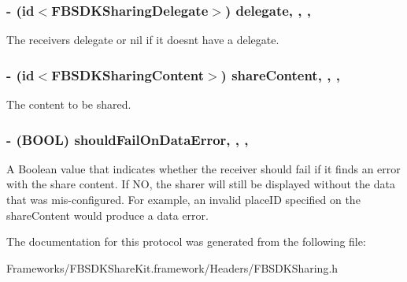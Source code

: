 \subsubsection[{delegate}]{\setlength{\rightskip}{0pt plus 5cm}-\/ (id$<${\bf F\+B\+S\+D\+K\+Sharing\+Delegate}$>$) delegate\hspace{0.3cm}{\ttfamily [read]}, {\ttfamily [write]}, {\ttfamily [nonatomic]}, {\ttfamily [weak]}}\label{protocol_f_b_s_d_k_sharing-p_a310585baeb89d309bda3879aaa1be72d}
The receiver\textquotesingle{}s delegate or nil if it doesn\textquotesingle{}t have a delegate. \hypertarget{protocol_f_b_s_d_k_sharing-p_a9cc352e3d8e8aec628ba42e8718bbeaf}{}
\subsubsection[{share\+Content}]{\setlength{\rightskip}{0pt plus 5cm}-\/ (id$<${\bf F\+B\+S\+D\+K\+Sharing\+Content}$>$) share\+Content\hspace{0.3cm}{\ttfamily [read]}, {\ttfamily [write]}, {\ttfamily [nonatomic]}, {\ttfamily [copy]}}\label{protocol_f_b_s_d_k_sharing-p_a9cc352e3d8e8aec628ba42e8718bbeaf}
The content to be shared. \hypertarget{protocol_f_b_s_d_k_sharing-p_ac1c01a21db7b956e8ea47df72f01d12d}{}
\subsubsection[{should\+Fail\+On\+Data\+Error}]{\setlength{\rightskip}{0pt plus 5cm}-\/ (B\+O\+O\+L) should\+Fail\+On\+Data\+Error\hspace{0.3cm}{\ttfamily [read]}, {\ttfamily [write]}, {\ttfamily [nonatomic]}, {\ttfamily [assign]}}\label{protocol_f_b_s_d_k_sharing-p_ac1c01a21db7b956e8ea47df72f01d12d}
A Boolean value that indicates whether the receiver should fail if it finds an error with the share content.  If N\+O, the sharer will still be displayed without the data that was mis-\/configured. For example, an invalid place\+I\+D specified on the share\+Content would produce a data error. 

The documentation for this protocol was generated from the following file\+:\begin{DoxyCompactItemize}
\item 
Frameworks/\+F\+B\+S\+D\+K\+Share\+Kit.\+framework/\+Headers/F\+B\+S\+D\+K\+Sharing.\+h\end{DoxyCompactItemize}
